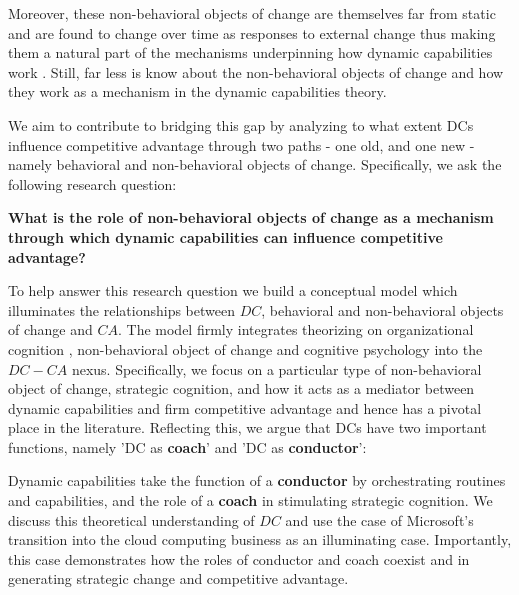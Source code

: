\documentclass[review,fleqn]{elsarticle}\usepackage[]{graphicx}\usepackage[]{color}
\begin{document}
Moreover, these non-behavioral objects of
change are themselves far from static and are found to change over time as responses to
external change \citep{Zollo2016} thus making them a natural part of the mechanisms
underpinning how dynamic capabilities work \citep{Schilke2018,Verona2011}.  Still, far less
is know about the non-behavioral objects of change and how they work as a mechanism in the
dynamic capabilities theory.

We aim to contribute to bridging this gap by analyzing to what extent DCs influence
competitive advantage through two paths - one old, and one new - namely behavioral and
non-behavioral objects of change.  Specifically, we ask the following research question:

{\bf What is the role of non-behavioral objects of change as a mechanism through which
  dynamic capabilities can influence competitive advantage?}


To help answer this research question we build a conceptual model which illuminates the
relationships between $DC$, behavioral and non-behavioral objects of change and $CA$. The
model firmly integrates theorizing on organizational cognition \citep{Lakoff1987},
non-behavioral object of change \citep{Verona2011} and cognitive psychology
\citep{Tversky1983,Kahneman2011} into the $DC-CA$ nexus. Specifically, we focus on a
particular type of non-behavioral object of change, strategic cognition, and how it acts
as a mediator between dynamic capabilities and firm competitive advantage and hence has a
pivotal place in the literature. Reflecting this, we argue that DCs have two important
functions, namely 'DC as {\bf coach}' and 'DC as {\bf conductor}':

Dynamic capabilities take the function of a {\bf conductor} by orchestrating routines and
capabilities, and the role of a {\bf coach} in stimulating strategic cognition.  We discuss this
theoretical understanding of $DC$ and use the case of Microsoft’s transition into the cloud
computing business as an illuminating case. Importantly, this case demonstrates how the
roles of conductor and coach coexist and in generating strategic change and competitive
advantage.
\end{document}
